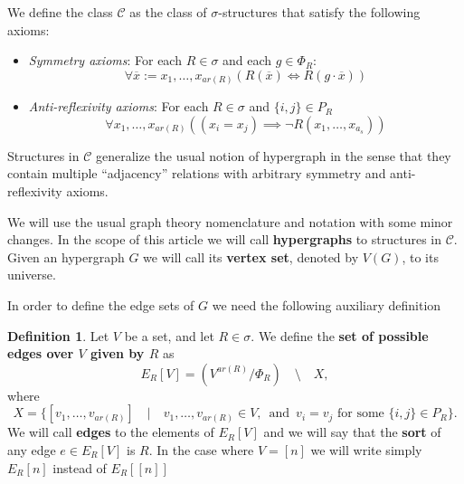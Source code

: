 \documentclass[12pt,notitlepage,a4paper]{article}
\theoremstyle{definition}
\newtheorem{definition}{Definition}[section]
\begin{document}


We define the class $\mathcal{C}$ as the 
class of $\sigma$-structures that
satisfy the 
following axioms: 
\begin{itemize}
	\item \textit{Symmetry axioms}: For each $R\in \sigma$ and
	each $g\in \Phi_R$:
	\[ \forall \overline{x}:=x_1,\dots, x_{ar(R)} \left(  R(\overline{x})
	\iff R(g\cdot\overline{x}) \right)    \]
	\item \textit{Anti-reflexivity axioms}: For each 
	$R\in \sigma$ and $\{i,j\}\in P_R$
	\[ \forall x_1,\dots, x_{ar(R)} 
	\left( (x_i=x_j) \implies \neg R(x_1,\dots, x_{a_s})
	\right)\]
\end{itemize}

Structures in $\mathcal{C}$ generalize the usual notion of hypergraph
in the sense that they contain multiple ``adjacency'' relations with arbitrary 
symmetry and anti-reflexivity axioms. \par
We will use the usual graph theory nomenclature and notation with some minor changes. 
In the scope of this article we will call \textbf{hypergraphs}
to structures in $\mathcal{C}$.
Given an hypergraph $G$ we will call its \textbf{vertex set}, denoted by $V(G)$,
to its universe.\par
In order to define the edge sets of $G$ we need the following auxiliary definition
\begin{definition} 
	Let $V$ be a set, and let $R\in \sigma$.
	We define the \textbf{set of possible edges over $V$
	given by $R$} as
	\[ E_R[V]= (V^{ar(R)}/\Phi_R) \quad \setminus 
	\quad X, \]
	where
	\[
	X=
	\Big\{ [v_1,\dots,v_{ar(R)}]  
	\quad \Big| \quad
	v_1,\dots,v_{ar(R)}\in V, \,
	\text{ and } 
	 \, v_i=v_j \text{ for some } 
	\{i,j\}\in P_R \Big\}.
	\]
	We will call \textbf{edges} to the elements of
	$E_R[V]$ and we will say that the \textbf{sort} of any edge $e\in E_R[V]$
	is $R$.	In the case where $V=[n]$ we will write simply $E_R[n]$ instead
	of $E_R[[n]]$
\end{definition}
\end{document}
